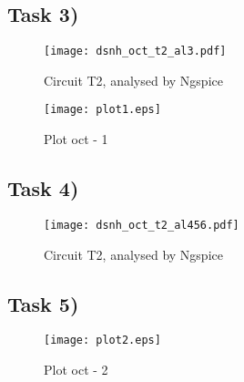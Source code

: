 \subsection{Task 3)}
\label{subsec:task3_a}

\begin{figure}[ht]
	\centering
	\texttt{[image: dsnh\_oct\_t2\_al3.pdf]}
	\caption{Circuit T2, analysed by Ngspice}
\label{fig:Dsnh_sim_t2}
\end{figure}

\begin{figure}[ht]
	\centering
	\texttt{[image: plot1.eps]}
	\caption{Plot oct - 1}
\label{fig:Dsnh_sim_t2}
\end{figure}

\subsection{Task 4)}
\label{subsec:task4_a}

\begin{figure}[ht]
	\centering
	\texttt{[image: dsnh\_oct\_t2\_al456.pdf]}
	\caption{Circuit T2, analysed by Ngspice}
\label{fig:Dsnh_sim_t2}
\end{figure}

\subsection{Task 5)}
\label{subsec:task5_a}


\begin{figure}[ht]
	\centering
	\texttt{[image: plot2.eps]}
	\caption{Plot oct - 2}
\label{fig:Dsnh_sim_t2}
\end{figure}


